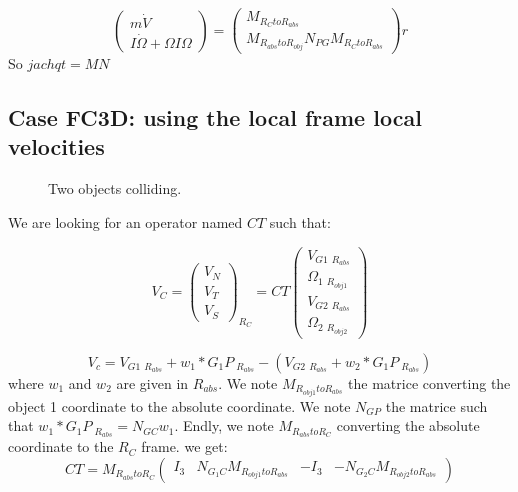 \[\left(\begin{array}{c}m \dot V\\I \dot \Omega + \Omega I \Omega \end{array}\right)=
\left(\begin{array}{c} M_{R_{C}toR_{abs}} \\
  M_{R_{abs}toR_{obj}}N_{PG}M_{R_{C}toR_{abs}}
\end{array}\right) r\]
So $jachqt=MN$

\subsection{Case FC3D: using the local frame local velocities}
\begin{figure}[h!]
  \centering
   \scalebox{0.6}{
  
  }
  \caption{Two objects colliding.}
  \label{figCase}
\end{figure}


We are looking for an operator named $CT$ such that:

\[V_C=\left(\begin{array}{c} V_N \\ V_T \\ V_S \end{array}\right)_{R_{C}}=CT \left(\begin{array}{c} V_{G1}~_{R_{abs}} \\ \Omega_1~_{R_{obj1}} \\ V_{G2}~_{R_{abs}}\\ \Omega_2~_{R_{obj2}} \end{array}\right)\]

\[V_c=V_{G1}~_{R_{abs}} + w_1 * G_1P~_{R_{abs}} -(V_{G2}~_{R_{abs}} + w_2 * G_1P~_{R_{abs}})\]
where $w_1$ and $w_2$ are given in $R_{abs}$. We note $M_{R_{obj1}toR_{abs}}$ the matrice converting the object 1 coordinate to the absolute coordinate. We note $N_{GP}$ the matrice such that $w_1*G_1P~_{R_{abs}} = N_{GC} w_1$. Endly, we note $M_{R_{abs}toR_C}$ converting the absolute coordinate to the $R_C$ frame.
we get:
\[CT= M_{R_{abs}toR_C}   \left(\begin{array}{cccc} I_3 & N_{G_1C}M_{R_{obj1}toR_{abs}} & -I_3 & -N_{G_2C}M_{R_{obj2}toR_{abs}} \end{array}\right)\]

